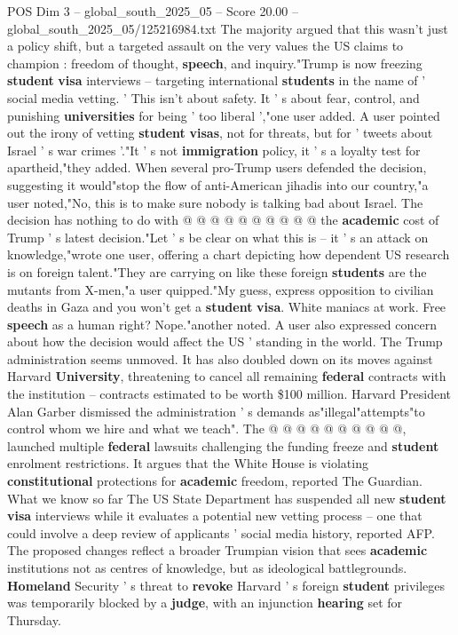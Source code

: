 \begin{textsample}{POS Dim 3 – global\_south\_2025\_05 – Score 20.00 – global\_south\_2025\_05/125216984.txt}
The majority argued that this wasn't just a policy shift, but a targeted assault on the very values the US claims to champion : freedom of thought, \textbf{speech}, and inquiry."Trump is now freezing \textbf{student} \textbf{visa} interviews -- targeting international \textbf{students} in the name of ' social media vetting. ' This isn't about safety.
It ' s about fear, control, and punishing \textbf{universities} for being ' too liberal ',"one user added.
A user pointed out the irony of vetting \textbf{student} \textbf{visas}, not for threats, but for ' tweets about Israel ' s war crimes '."It ' s not \textbf{immigration} policy, it ' s a loyalty test for apartheid,"they added.
When several pro-Trump users defended the decision, suggesting it would"stop the flow of anti-American jihadis into our country,"a user noted,"No, this is to make sure nobody is talking bad about Israel.
The decision has nothing to do with @ @ @ @ @ @ @ @ @ @ the \textbf{academic} cost of Trump ' s latest decision."Let ' s be clear on what this is -- it ' s an attack on knowledge,"wrote one user, offering a chart depicting how dependent US research is on foreign talent."They are carrying on like these foreign \textbf{students} are the mutants from X-men,"a user quipped."My guess, express opposition to civilian deaths in Gaza and you won't get a \textbf{student} \textbf{visa}.
White maniacs at work.
Free \textbf{speech} as a human right?
Nope."another noted.
A user also expressed concern about how the decision would affect the US ' standing in the world.
The Trump administration seems unmoved.
It has also doubled down on its moves against Harvard \textbf{University}, threatening to cancel all remaining \textbf{federal} contracts with the institution -- contracts estimated to be worth \$100 million.
Harvard President Alan Garber dismissed the administration ' s demands as"illegal"attempts"to control whom we hire and what we teach".
The @ @ @ @ @ @ @ @ @ @, launched multiple \textbf{federal} lawsuits challenging the funding freeze and \textbf{student} enrolment restrictions.
It argues that the White House is violating \textbf{constitutional} protections for \textbf{academic} freedom, reported The Guardian.
What we know so far The US State Department has suspended all new \textbf{student} \textbf{visa} interviews while it evaluates a potential new vetting process -- one that could involve a deep review of applicants ' social media history, reported AFP.
The proposed changes reflect a broader Trumpian vision that sees \textbf{academic} institutions not as centres of knowledge, but as ideological battlegrounds. \textbf{Homeland} Security ' s threat to \textbf{revoke} Harvard ' s foreign \textbf{student} privileges was temporarily blocked by a \textbf{judge}, with an injunction \textbf{hearing} set for Thursday.

\end{textsample}
